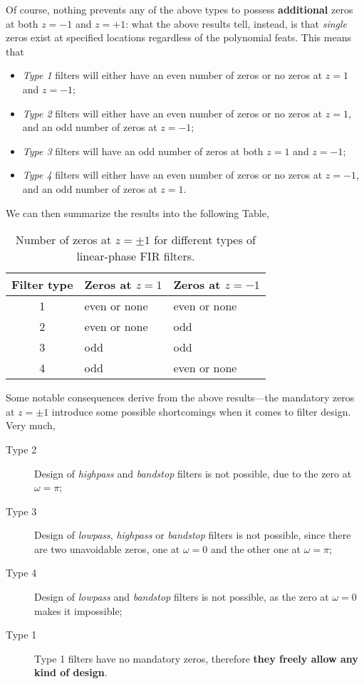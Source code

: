 \documentclass[\documentfontsize, twocolumn]{\classname}
\begin{document}
Of course, nothing prevents any of the above types to possess \textbf{additional} zeros at both $z=-1$ and $z=+1$: what the above results tell, instead, is that \emph{single} zeros exist at specified locations regardless of the polynomial feats. This means that
\begin{itemize}
    \item \emph{Type 1} filters will either have an even number of zeros or no zeros at $z=1$ and $z=-1$;
    \item \emph{Type 2} filters will either have an even number of zeros or no zeros at $z=1$, and an odd number of zeros at $z=-1$;
    \item \emph{Type 3} filters will have an odd number of zeros at both $z=1$ and $z=-1$;
    \item \emph{Type 4} filters will either have an even number of zeros or no zeros at $z=-1$, and an odd number of zeros at $z=1$.
\end{itemize}

We can then summarize the results into the following Table,
\begin{table}[ht]
\centering
\begin{tabular}{c|ll}
    \textbf{Filter type} & \textbf{Zeros at} $z=1$ & \textbf{Zeros at} $z=-1$ \\
    \hline
    1 & even or none & even or none\\
    2 & even or none & odd\\
    3 & odd & odd\\
    4 & odd & even or none
\end{tabular}
\caption{Number of zeros at $z=\pm 1$ for different types of linear-phase FIR filters.}\label{tab:linearPhaseGeneralZeroNumbers}
\end{table}
\bigskip

Some notable consequences derive from the above results---the mandatory zeros at $z = \pm 1$ introduce some possible shortcomings when it comes to filter design. Very much,
\begin{description}
    \item[Type 2] Design of \emph{highpass} and \emph{bandstop} filters is not possible, due to the zero at $\omega=\pi$;
    \item[Type 3] Design of \emph{lowpass}, \emph{highpass} or \emph{bandstop} filters is not possible, since there are two unavoidable zeros, one at $\omega = 0$ and the other one at $\omega = \pi$;
    \item[Type 4] Design of \emph{lowpass} and \emph{bandstop} filters is not possible, as the zero at $\omega = 0$ makes it impossible;
    \item[Type 1] Type 1 filters have no mandatory zeros, therefore \textbf{they freely allow any kind of design}.
\end{description}
\end{document}

